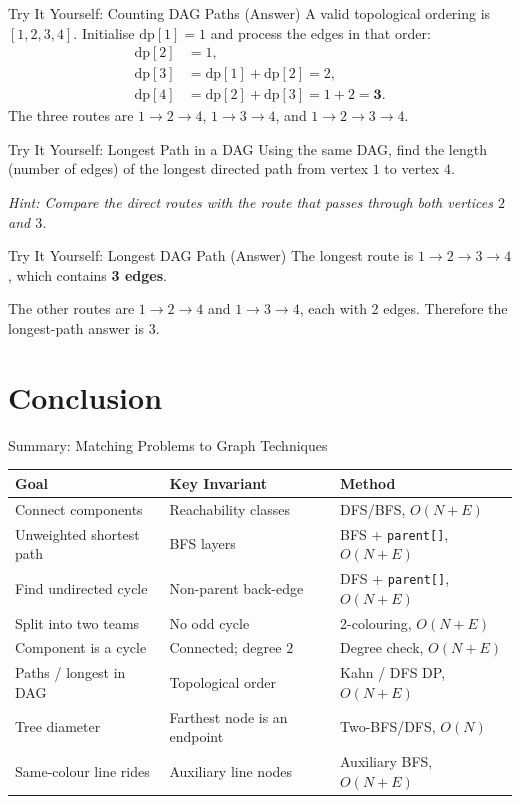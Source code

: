\documentclass{beamer}
\begin{document}
\begin{frame}{Try It Yourself: Counting DAG Paths (Answer)}
  A valid topological ordering is $[1,2,3,4]$. Initialise $\text{dp}[1]=1$ and process the edges in that order:
  \begin{align*}
    \text{dp}[2] &= 1,\\
    \text{dp}[3] &= \text{dp}[1]+\text{dp}[2]=2,\\
    \text{dp}[4] &= \text{dp}[2]+\text{dp}[3]=1+2=\mathbf{3}.
  \end{align*}
  The three routes are $1\to2\to4$, $1\to3\to4$, and $1\to2\to3\to4$.
\end{frame}

\begin{frame}{Try It Yourself: Longest Path in a DAG}
  Using the same DAG, find the length (number of edges) of the longest directed path from vertex $1$ to vertex $4$.

  \vspace{0.8em}
  \emph{Hint: Compare the direct routes with the route that passes through both vertices $2$ and $3$.}
\end{frame}

\begin{frame}{Try It Yourself: Longest DAG Path (Answer)}
  The longest route is $1\to2\to3\to4$, which contains \textbf{3 edges}.

  The other routes are $1\to2\to4$ and $1\to3\to4$, each with 2 edges. Therefore the longest-path answer is $3$.
\end{frame}

\section{Conclusion}

\begin{frame}{Summary: Matching Problems to Graph Techniques}
  \centering
  {\scriptsize\setlength{\tabcolsep}{1pt}
  \begin{tabular}{lll}
    \toprule
    \textbf{Goal} & \textbf{Key Invariant} & \textbf{Method} \\
    \midrule
    Connect components & Reachability classes & DFS/BFS, $O(N{+}E)$ \\
    Unweighted shortest path & BFS layers & BFS + \texttt{parent[]}, $O(N{+}E)$ \\
    Find undirected cycle & Non-parent back-edge & DFS + \texttt{parent[]}, $O(N{+}E)$ \\
    Split into two teams & No odd cycle & 2-colouring, $O(N{+}E)$ \\
    Component is a cycle & Connected; degree $2$ & Degree check, $O(N{+}E)$ \\
    Paths / longest in DAG & Topological order & Kahn / DFS DP, $O(N{+}E)$ \\
    Tree diameter & Farthest node is an endpoint & Two-BFS/DFS, $O(N)$ \\
    Same-colour line rides & Auxiliary line nodes & Auxiliary BFS, $O(N{+}E)$ \\
    \bottomrule
  \end{tabular}}
\end{frame}
\end{document}
